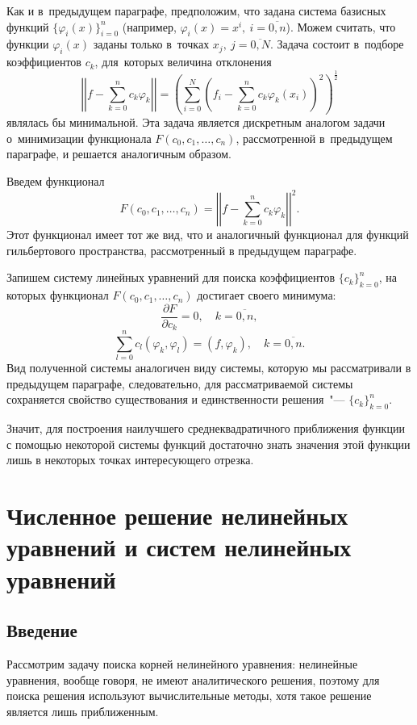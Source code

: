 \documentclass[11pt,a4paper,twoside,listtotoc,bibtotoc]{report}
\numberwithin{equation}{section}
\theoremstyle{definition}
\theoremstyle{plain}
\begin{document}
Как и в~предыдущем параграфе, предположим, что задана система базисных функций
$\{\varphi_i(x)\}_{i=0}^n$ (например, $\varphi_i(x) = x^i,~i=\overline{0,n}$).
Можем считать, что функции $\varphi_i(x)$ заданы только в~точках
$x_j,~j=\overline{0,N}$. Задача состоит в~подборе коэффициентов $c_k$,
для~которых величина отклонения
%
$$
    \left|\left|f - \sum\limits_{k=0}^n c_k \varphi_k\right|\right| = \left(\sum\limits_{i=0}^N
    \left(f_i - \sum\limits_{k=0}^n c_k \varphi_k(x_i)\right)^2\right)^\frac{1}{2}
$$
%
являлась бы минимальной. Эта задача является дискретным аналогом задачи
о~минимизации функционала $F(c_0, c_1, \ldots, c_n)$, рассмотренной в~предыдущем
параграфе, и решается аналогичным
образом.

Введем функционал
%
$$
    F(c_0, c_1, \ldots, c_n) = \left|\left|f - \sum\limits_{k=0}^{n} c_k \varphi_k
    \right|\right|^2.
$$
%
Этот функционал имеет тот же вид, что и аналогичный
функционал для функций гильбертового пространства, рассмотренный в предыдущем параграфе.

Запишем систему линейных уравнений для поиска коэффициентов $\{c_k\}_{k=0}^{n}$, на
которых функционал $F(c_0, c_1, \ldots, c_n)$ достигает своего минимума:
%
$$
    \frac{\partial F}{\partial c_k} = 0, \quad k = \overline{0,n},
$$
%
%
$$
    \sum\limits_{l=0}^{n} c_l (\varphi_k, \varphi_l) = (f, \varphi_k),
    \quad k = \overline{0,n}.
$$
%
Вид полученной системы аналогичен виду системы, которую мы рассматривали в предыдущем
параграфе, следовательно, для рассматриваемой системы сохраняется свойство существования и
единственности решения~"--- $\{c_k\}_{k=0}^{n}$.

Значит, для построения наилучшего среднеквадратичного приближения функции
с помощью некоторой системы функций достаточно знать значения этой функции
лишь в некоторых точках интересующего отрезка.
%
\chapter{Численное решение нелинейных уравнений и систем нелинейных уравнений}
%
\label{chapter_nonlinear_eqs}
%
\section{Введение}
%

Рассмотрим задачу поиска корней нелинейного уравнения: нелинейные уравнения,
вообще говоря, не имеют аналитического решения, поэтому для поиска решения
используют вычислительные методы, хотя такое решение является лишь приближенным.
\end{document}
